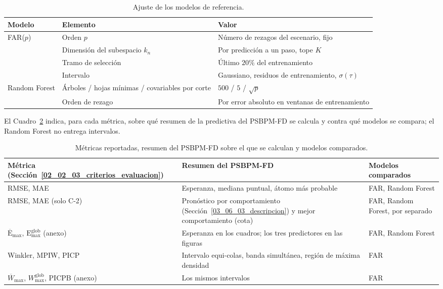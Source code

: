 \begin{table}[H]
\centering\small
\caption{Ajuste de los modelos de referencia.}
\label{tab:dis_referencia}
\begin{tabular}{p{} p{} p{}}
\hline
Modelo & Elemento & Valor \\
\hline
FAR($p$) & Orden $p$                       & Número de rezagos del escenario, fijo \\
         & Dimensión del subespacio $k_n$  & Por predicción a un paso, tope $K$ \\
         & Tramo de selección              & Último $20\%$ del entrenamiento \\
         & Intervalo                       & Gaussiano, residuos de entrenamiento, $\sigma(\tau)$ \\
Random Forest & Árboles / hojas mínimas / covariables por corte & $500$ / $5$ / $\sqrt{p}$ \\
         & Orden de rezago                 & Por error absoluto en ventanas de entrenamiento \\
\hline
\end{tabular}
\end{table}

El Cuadro~\ref{tab:dis_resumen_metrica} indica, para cada métrica, sobre qué resumen de la predictiva del PSBPM-FD se calcula y contra qué modelos se compara; el Random Forest no entrega intervalos.

\begin{table}[H]
\centering\small
\caption{Métricas reportadas, resumen del PSBPM-FD sobre el que se calculan y modelos comparados.}
\label{tab:dis_resumen_metrica}
\begin{tabular}{p{} p{} p{}}
\hline
Métrica (Sección~\ref{02_02_03_criterios_evaluacion}) & Resumen del PSBPM-FD & Modelos comparados \\
\hline
RMSE, MAE & Esperanza, mediana puntual, átomo más probable & FAR, Random Forest \\
RMSE, MAE (solo C-2) & Pronóstico por comportamiento (Sección~\ref{03_06_03_descripcion}) y mejor comportamiento (cota) & FAR, Random Forest, por separado \\
$\overline{\mathrm{E}}_{\max}$, $\mathrm{E}_{\max}^{\mathrm{glob}}$ (anexo) & Esperanza en los cuadros; los tres predictores en las figuras & FAR, Random Forest \\
Winkler, MPIW, PICP & Intervalo equi-colas, banda simultánea, región de máxima densidad & FAR \\
$\overline{W}_{\max}$, $W_{\max}^{\mathrm{glob}}$, PICPB (anexo) & Los mismos intervalos & FAR \\
\hline
\end{tabular}
\end{table}

